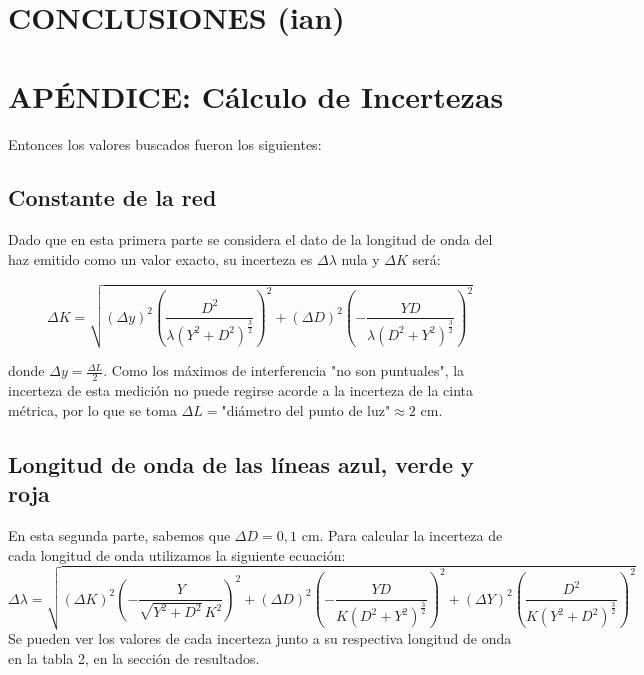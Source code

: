 \documentclass[12pt, a4paper]{article}
\begin{document}
\section{CONCLUSIONES (ian)}

\section{APÉNDICE: Cálculo de Incertezas}
Entonces los valores buscados fueron los siguientes:

\subsection{Constante de la red}
Dado que en esta primera parte se considera el dato de la longitud de onda del haz emitido como un valor exacto, su incerteza es $\Delta \lambda$ nula y ${\Delta}K$ será:

\begin{equation}
  {\Delta}K = \sqrt{({\Delta}y)^2(\frac{D^{2}}{{\lambda} \left(Y^{2} + D^{2}\right)^{\frac{3}{2}}})^2+({\Delta}D)^2(-\frac{YD}{{\lambda} \left(D^{2} + Y^{2}\right)^{\frac{3}{2}}})^2}
\label{equation5}
\end{equation}

donde $\Delta y = \frac{\Delta L}{2}$. Como los máximos de interferencia "no son puntuales", la incerteza de esta medición no puede regirse acorde a la incerteza de la cinta métrica, por lo que se toma $\Delta L = $"diámetro del punto de luz"$\approx 2$ cm.

\subsection{ Longitud de onda de las líneas azul, verde y roja}
En esta segunda parte, sabemos que $\Delta D = 0,1$ cm.
Para calcular la incerteza de cada longitud de onda utilizamos la siguiente ecuación:
\begin{equation}
  {\Delta}{\lambda} = \sqrt{({\Delta}K)^2(-\frac{Y}{\sqrt{Y^{2} + 
  D^{2}} \, K^{2}})^2 + ({\Delta}D)^2(-\frac{YD}{K \left(D^{2} + Y^{2}\right)^{\frac{3}{2}}})^2+ ({\Delta}Y)^2(\frac{D^{2}}{K \left(Y^{2} + D^{2}\right)^{\frac{3}{2}}})^2}
\label{equation5}
\end{equation}
Se pueden ver los valores de cada incerteza junto a su respectiva longitud de onda en la tabla 2, en la sección de resultados.
\end{document}
